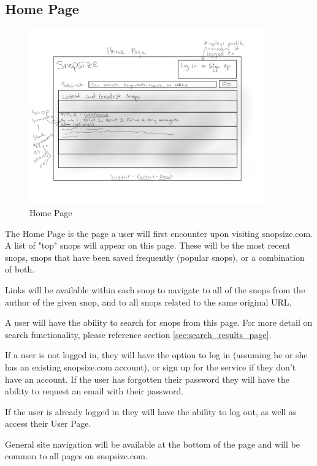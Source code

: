 \documentclass[11pt]{article}
\begin{document}
\subsection{Home Page}
\begin{figure}[htb]
\begin{center}
\includegraphics[width=0.9\textwidth]{home_page.png}
\caption{Home Page}
\label{fig:fig_home_page}
\end{center}
\end{figure}
The Home Page is the page a user will first encounter upon visiting snopsize.com. A list of "top" snops will appear on this page. These will be the most recent snops, snops that have been saved frequently (popular snops), or a combination of both.

Links will be available within each snop to navigate to all of the snops from the author of the given snop, and to all snops related to the same original URL.

A user will have the ability to search for snops from this page. For more detail on search functionality, please reference section \ref{sec:search_results_page}. 

If a user is not logged in, they will have the option to log in (assuming he or she has an existing snopsize.com account), or sign up for the service if they don't have an account. If the user has forgotten their password they will have the ability to request an email with their password.

If the user is already logged in they will have the ability to log out, as well as access their User Page. 

General site navigation will be available at the bottom of the page and will be common to all pages on snopsize.com.
\end{document}
